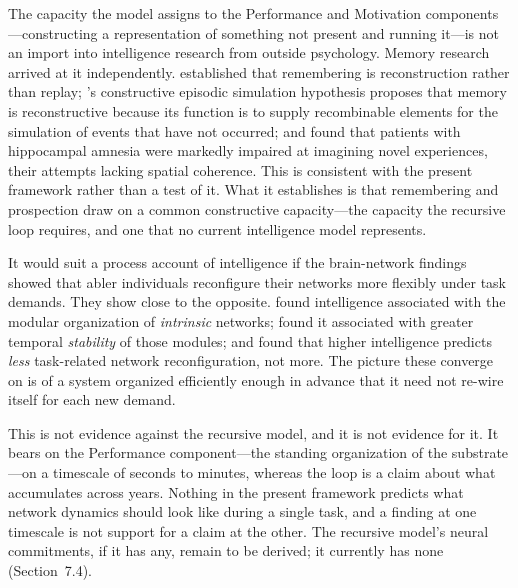 \documentclass[12pt,a4paper]{article}
\begin{document}
The capacity the model assigns to the Performance and Motivation components---\hspace{0pt}constructing a representation of something not present and running it---\hspace{0pt}is not an import into intelligence research from outside psychology. Memory research arrived at it independently. \citet{Bartlett1932} established that remembering is reconstruction rather than replay; \citeauthor{SchacterAddis2007}'s \citeyearpar{SchacterAddis2007} constructive episodic simulation hypothesis proposes that memory is reconstructive because its function is to supply recombinable elements for the simulation of events that have not occurred; and \citet{Hassabis2007} found that patients with hippocampal amnesia were markedly impaired at imagining novel experiences, their attempts lacking spatial coherence. This is consistent with the present framework rather than a test of it. What it establishes is that remembering and prospection draw on a common constructive capacity---\hspace{0pt}the capacity the recursive loop requires, and one that no current intelligence model represents.

It would suit a process account of intelligence if the brain-network findings showed that abler individuals reconfigure their networks more flexibly under task demands. They show close to the opposite.  found intelligence associated with the modular organization of \emph{intrinsic} networks; \citet{Hilger2020} found it associated with greater temporal \emph{stability} of those modules; and \citet{SchultzCole2016} found that higher intelligence predicts \emph{less} task-related network reconfiguration, not more. The picture these converge on is of a system organized efficiently enough in advance that it need not re-wire itself for each new demand.

This is not evidence against the recursive model, and it is not evidence for it. It bears on the Performance component---\hspace{0pt}the standing organization of the substrate---\hspace{0pt}on a timescale of seconds to minutes, whereas the loop is a claim about what accumulates across years. Nothing in the present framework predicts what network dynamics should look like during a single task, and a finding at one timescale is not support for a claim at the other. The recursive model's neural commitments, if it has any, remain to be derived; it currently has none (Section~7.4).
\end{document}
